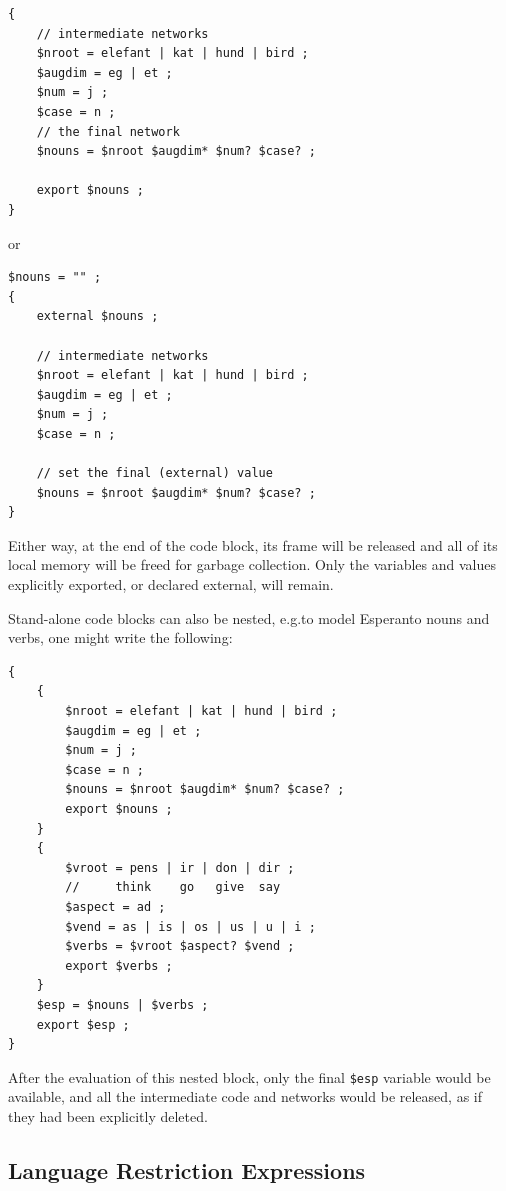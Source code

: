 \documentclass[letterpaper,12pt]{article}
\begin{document}
\begin{samepage}
\begin{Verbatim}[fontsize=\small]
{
    // intermediate networks
    $nroot = elefant | kat | hund | bird ;
    $augdim = eg | et ;
    $num = j ;
    $case = n ;
    // the final network
    $nouns = $nroot $augdim* $num? $case? ;

    export $nouns ;
}
\end{Verbatim}
\end{samepage}

\noindent
or

\begin{Verbatim}[fontsize=\small]
$nouns = "" ;
{
    external $nouns ;

    // intermediate networks
    $nroot = elefant | kat | hund | bird ;
    $augdim = eg | et ;
    $num = j ;
    $case = n ;

    // set the final (external) value
    $nouns = $nroot $augdim* $num? $case? ;
}
\end{Verbatim}

\noindent
Either way, at the end of the code block, its frame will be released and
all of its local memory will be freed for garbage collection.  Only the
variables and values explicitly exported, or declared external, will
remain.

Stand-alone code blocks can also be nested, e.g.\@ to model Esperanto
nouns and verbs, one might write the following:

\begin{Verbatim}[fontsize=\small]
{
    {
        $nroot = elefant | kat | hund | bird ;
        $augdim = eg | et ;
        $num = j ;
        $case = n ;
        $nouns = $nroot $augdim* $num? $case? ;
        export $nouns ;
    }
    {
        $vroot = pens | ir | don | dir ;
        //     think    go   give  say
        $aspect = ad ;
        $vend = as | is | os | us | u | i ;
        $verbs = $vroot $aspect? $vend ;
        export $verbs ;
    }
    $esp = $nouns | $verbs ;
    export $esp ;
}
\end{Verbatim}

\noindent
After the evaluation of this nested block, only the final \verb!$esp!
variable would be available, and all the intermediate code and networks
would be released, as if they had been explicitly deleted.

\subsection{Language Restriction Expressions}
\end{document}
